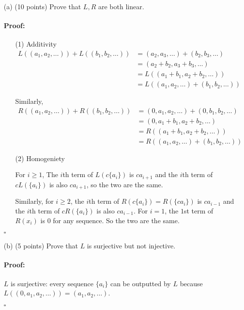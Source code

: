 \documentclass[12pt]{article}
\renewcommand\ge{\geqslant}
\newenvironment{proof}{\paragraph{Proof:}}{\hfill$\square$}
\begin{document}
    \begin{enumerate}
     \item[(a)] (10 points) Prove that $L,R$ are both linear.
    
     \begin{proof}
         \begin{enumerate}
            \item[(1)] Additivity
            \begin{align*}
                L((a_1, a_2,\ldots )) + L((b_1, b_2, \ldots )) &=
                (a_2, a_3, \ldots ) + (b_2, b_3, \ldots)\\
                &= (a_2+b_2, a_3+b_3, \ldots)\\
                &= L((a_1+b_1, a_2+b_2, \ldots))\\
                &= L((a_1, a_2,\ldots ) + (b_1, b_2, \ldots))
            \end{align*}
    
            Similarly,
            \begin{align*}
                R((a_1, a_2,\ldots )) + R((b_1, b_2, \ldots )) &=
                (0, a_1, a_2, \ldots ) + (0, b_1, b_2, \ldots)\\
                &= (0, a_1+b_1, a_2+b_2, \ldots)\\
                &= R((a_1+b_1, a_2+b_2, \ldots))\\
                &= R((a_1, a_2,\ldots ) + (b_1, b_2, \ldots))
            \end{align*}
    
            \item[(2)] Homogeniety
    
            For $i\ge 1$, The $i$th term of $L(c\{a_i\})$ is $ca_{i+1}$ and the $i$th term of $cL(\{a_i\})$ is also $ca_{i+1}$, so the two are the same.
    
            Similarly, for $i\ge 2$, the $i$th term of $R(c\{a_i\})=R(\{ca_i\})$ is $ca_{i-1}$ and the $i$th term of $cR(\{a_i\})$ is also $ca_{i-1}$. For $i=1$, the $1$st term of $R(x_i)$ is $0$ for any sequence. So the two are the same.
    
        \end{enumerate}
     \end{proof}
    
     \item[(b)] (5 points) Prove that $L$ is surjective but not injective.
    
     \begin{proof}
         $L$ is surjective: every sequence $\{a_i\}$ can be outputted by $L$ because $L((0, a_1, a_2, \ldots)) = (a_1, a_2,\ldots)$.
    

\end{proof}
\end{enumerate}
\end{document}
